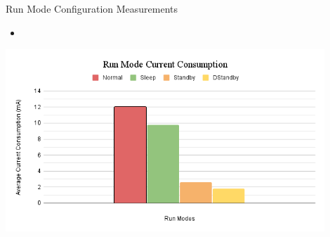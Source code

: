\begin{frame}{Run Mode Configuration Measurements}
    \begin{itemize}
        \item 
    \end{itemize}
    \includegraphics[height=0.5\textheight,width=0.9\textwidth,keepaspectratio]{images/run_modes.png}
\end{frame}
    



